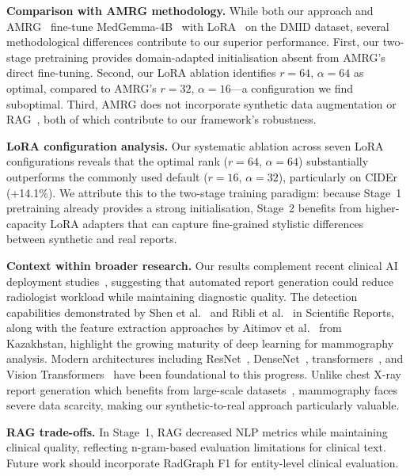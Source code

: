 \documentclass{wlscirep}
\begin{document}
\textbf{Comparison with AMRG methodology.} While both our approach and AMRG~\cite{sung2025} fine-tune MedGemma-4B~\cite{lin2024medgemma} with LoRA~\cite{hu2022lora} on the DMID dataset, several methodological differences contribute to our superior performance. First, our two-stage pretraining provides domain-adapted initialisation absent from AMRG's direct fine-tuning. Second, our LoRA ablation identifies $r=64$, $\alpha=64$ as optimal, compared to AMRG's $r=32$, $\alpha=16$---a configuration we find suboptimal. Third, AMRG does not incorporate synthetic data augmentation or RAG~\cite{lewis2020rag}, both of which contribute to our framework's robustness.

\textbf{LoRA configuration analysis.} Our systematic ablation across seven LoRA~\cite{hu2022lora} configurations reveals that the optimal rank ($r=64$, $\alpha=64$) substantially outperforms the commonly used default ($r=16$, $\alpha=32$), particularly on CIDEr (+14.1\%). We attribute this to the two-stage training paradigm: because Stage~1 pretraining already provides a strong initialisation, Stage~2 benefits from higher-capacity LoRA adapters that can capture fine-grained stylistic differences between synthetic and real reports.

\textbf{Context within broader research.} Our results complement recent clinical AI deployment studies~\cite{dembrower2020effect, salim2020external, aboutalib2018deep}, suggesting that automated report generation could reduce radiologist workload while maintaining diagnostic quality. The detection capabilities demonstrated by Shen et al.~\cite{shen2019deep} and Ribli et al.~\cite{ribli2018detecting} in Scientific Reports, along with the feature extraction approaches by Aitimov et al.~\cite{aitimov2025feature} from Kazakhstan, highlight the growing maturity of deep learning for mammography analysis. Modern architectures including ResNet~\cite{he2016deep}, DenseNet~\cite{huang2017densely}, transformers~\cite{vaswani2017attention}, and Vision Transformers~\cite{dosovitskiy2021vit} have been foundational to this progress. Unlike chest X-ray report generation which benefits from large-scale datasets~\cite{johnson2019mimiccxr}, mammography faces severe data scarcity, making our synthetic-to-real approach particularly valuable.

\textbf{RAG trade-offs.} In Stage~1, RAG decreased NLP metrics while maintaining clinical quality, reflecting n-gram-based evaluation limitations for clinical text. Future work should incorporate RadGraph F1 for entity-level clinical evaluation.
\end{document}

